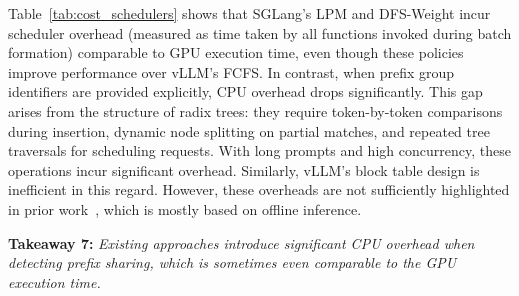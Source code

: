 Table~\ref{tab:cost_schedulers} shows that SGLang's LPM and DFS-Weight incur scheduler overhead (measured as time taken by all functions invoked during batch formation) comparable to GPU execution time, even though these policies improve performance over vLLM's FCFS. In contrast, when prefix group identifiers are provided explicitly, CPU overhead drops significantly. This gap arises from the structure of radix trees: they require token-by-token comparisons during insertion, dynamic node splitting on partial matches, and repeated tree traversals for scheduling requests. With long prompts and high concurrency, these operations incur significant overhead. Similarly, vLLM's block table design is inefficient in this regard. However, these overheads are not sufficiently highlighted in prior work~\cite{zheng2025batchllmoptimizinglargebatched,zhao2024blendserveoptimizingofflineinference}, which is mostly based on offline inference.

\textbf{Takeaway 7:} \textit{Existing approaches introduce significant CPU overhead when detecting prefix sharing, which is sometimes even comparable to the GPU execution time.}